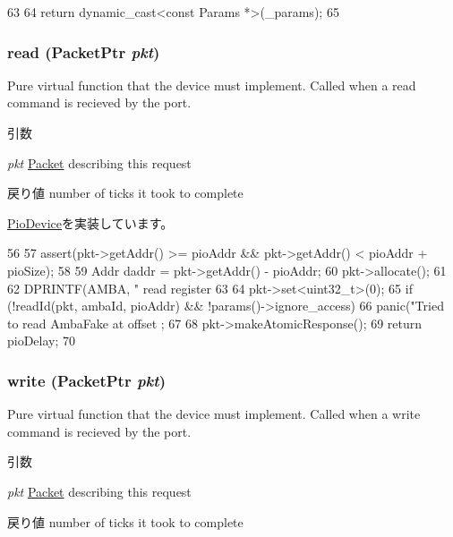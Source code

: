 \begin{DoxyCode}
63     {
64         return dynamic_cast<const Params *>(_params);
65     }
\end{DoxyCode}
\hypertarget{classAmbaFake_a613ec7d5e1ec64f8d21fec78ae8e568e}{
\subsubsection[{read}]{ read ({\bf PacketPtr} {\em pkt})}}
\label{classAmbaFake_a613ec7d5e1ec64f8d21fec78ae8e568e}
Pure virtual function that the device must implement. Called when a read command is recieved by the port. 
\begin{DoxyParams}{引数}
\item[{\em pkt}]\hyperlink{classPacket}{Packet} describing this request \end{DoxyParams}
\begin{DoxyReturn}{戻り値}
number of ticks it took to complete 
\end{DoxyReturn}


\hyperlink{classPioDevice_a842312590432036092c422c87a442358}{PioDevice}を実装しています。


\begin{DoxyCode}
56 {
57     assert(pkt->getAddr() >= pioAddr && pkt->getAddr() < pioAddr + pioSize);
58 
59     Addr daddr = pkt->getAddr() - pioAddr;
60     pkt->allocate();
61 
62     DPRINTF(AMBA, " read register %
63 
64     pkt->set<uint32_t>(0);
65     if (!readId(pkt, ambaId, pioAddr) && !params()->ignore_access)
66         panic("Tried to read AmbaFake at offset %
      ;
67 
68     pkt->makeAtomicResponse();
69     return pioDelay;
70 }
\end{DoxyCode}
\hypertarget{classAmbaFake_a4cefab464e72b5dd42c003a0a4341802}{
\subsubsection[{write}]{ write ({\bf PacketPtr} {\em pkt})}}
\label{classAmbaFake_a4cefab464e72b5dd42c003a0a4341802}
Pure virtual function that the device must implement. Called when a write command is recieved by the port. 
\begin{DoxyParams}{引数}
\item[{\em pkt}]\hyperlink{classPacket}{Packet} describing this request \end{DoxyParams}
\begin{DoxyReturn}{戻り値}
number of ticks it took to complete 
\end{DoxyReturn}


